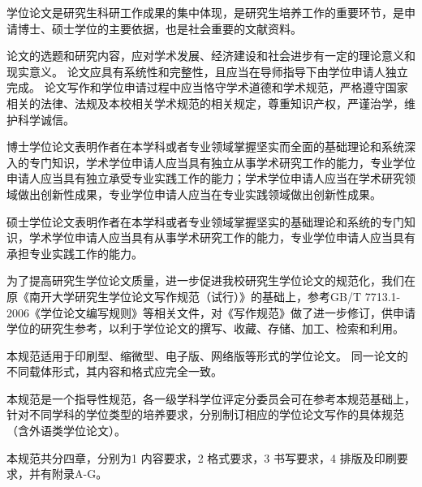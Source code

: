 \begin{preface}
    学位论文是研究生科研工作成果的集中体现，是研究生培养工作的重要环节，是申请博士、硕士学位的主要依据，也是社会重要的文献资料。

    论文的选题和研究内容，应对学术发展、经济建设和社会进步有一定的理论意义和现实意义。
    论文应具有系统性和完整性，且应当在导师指导下由学位申请人独立完成。
    论文写作和学位申请过程中应当恪守学术道德和学术规范，严格遵守国家相关的法律、法规及本校相关学术规范的相关规定，尊重知识产权，严谨治学，维护科学诚信。

    博士学位论文表明作者在本学科或者专业领域掌握坚实而全面的基础理论和系统深入的专门知识，学术学位申请人应当具有独立从事学术研究工作的能力，专业学位申请人应当具有独立承受专业实践工作的能力；学术学位申请人应当在学术研究领域做出创新性成果，专业学位申请人应当在专业实践领域做出创新性成果。

    硕士学位论文表明作者在本学科或者专业领域掌握坚实的基础理论和系统的专门知识，学术学位申请人应当具有从事学术研究工作的能力，专业学位申请人应当具有承担专业实践工作的能力。

    为了提高研究生学位论文质量，进一步促进我校研究生学位论文的规范化，我们在原《南开大学研究生学位论文写作规范（试行）》的基础上，参考GB/T 7713.1-2006《学位论文编写规则》等相关文件，对《写作规范》做了进一步修订，供申请学位的研究生参考，以利于学位论文的撰写、收藏、存储、加工、检索和利用。

    本规范适用于印刷型、缩微型、电子版、网络版等形式的学位论文。
    同一论文的不同载体形式，其内容和格式应完全一致。

    本规范是一个指导性规范，各一级学科学位评定分委员会可在参考本规范基础上，针对不同学科的学位类型的培养要求，分别制订相应的学位论文写作的具体规范（含外语类学位论文）。

    本规范共分四章，分别为1 内容要求，2 格式要求，3 书写要求，4 排版及印刷要求，并有附录A-G。
\end{preface}
